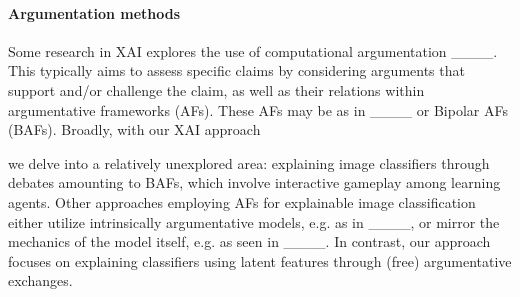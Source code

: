 \paragraph{Argumentation methods}
Some research in XAI explores the use of computational argumentation ____. 
This typically aims to assess specific claims by considering arguments that %
support and/or challenge the claim, as well as their relations within %
argumentative frameworks (AFs). 
These AFs 
may be as in ____ or %
Bipolar AFs (BAFs).
Broadly, with our XAI 
approach 
\iffalse leads to debates that can be viewed as %
simple BAFs; however, conducting a comprehensive analysis of these AFs' properties is beyond the scope of this paper. 
Instead, 
\fi 
we delve into a relatively unexplored area: explaining image classifiers through debates amounting to %
BAFs, which involve interactive gameplay among learning %
agents. 
%
Other approaches employing AFs for explainable image classification either utilize intrinsically argumentative models, e.g. as in ____, or mirror the mechanics of the model itself, e.g. as seen in  ____. 
In contrast, our approach focuses on explaining classifiers using latent features through (free) argumentative exchanges.

%



